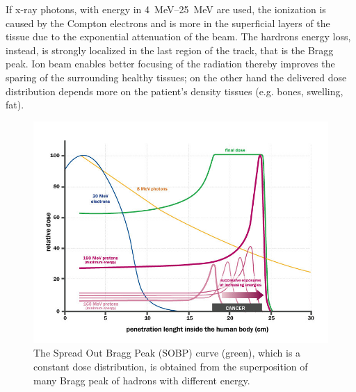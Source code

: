         If x-ray photons, with energy in \SIrange{4}{25}{MeV} are used, the ionization is caused by the Compton electrons and is more in the superficial layers of the tissue due to the exponential attenuation of the beam. 
        The hardrons energy loss, instead, is strongly localized in the last region of the track, that is the Bragg peak. 
        Ion beam enables better focusing of the radiation thereby improves the sparing of the surrounding healthy tissues; on the other hand the delivered dose distribution depends more on the patient's density tissues (e.g. bones, swelling, fat). 

        \begin{figure}
            \centering
            \includegraphics[width=.7\linewidth]{figures/pixel_detectors_usage/Bragg-Peak.png}
            \caption{The Spread Out Bragg Peak (SOBP) curve (green), which is a constant dose distribution, is obtained from the superposition of many Bragg peak of hadrons with different energy.}
            \label{fig:Bragg-peak}
         \end{figure}

